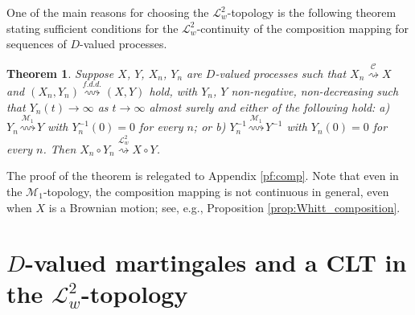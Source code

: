 \documentclass[final]{amsart}
\newtheorem{thm}{Theorem}[section]
\theoremstyle{definition}
\numberwithin{equation}{section}
\newcommand{\cC}{\ensuremath{\mathcal{C}}}
\newcommand{\cL}{\ensuremath{\mathcal{L}}}
\newcommand{\cM}{\ensuremath{\mathcal{M}}}
\begin{document}
One of the main reasons for choosing the $\cL^2_w$-topology is the following theorem stating sufficient conditions
for the $\cL^2_w$-continuity of the composition mapping for sequences of $D$-valued processes.

\begin{thm}\label{thm:comp}
Suppose $X$, $Y$, $X_n$, $Y_n$ are $D$-valued processes such that
$X_n\stackrel{\cC}{\rightsquigarrow} X$ and $(X_n,Y_n) \stackrel{f.d.d.}{\rightsquigarrow} (X,Y)$ hold,
with $Y_n$, $Y$ non-negative, non-decreasing such that $Y_n(t) \to\infty$ as $t\to\infty$ almost surely
and either of the following hold:
a) $Y_n \stackrel{\cM_1}{\rightsquigarrow} Y$ with $Y_n^{-1}(0)=0$ for every $n$; or
b) $Y_n^{-1} \stackrel{\cM_1}{\rightsquigarrow} Y^{-1}$ with $Y_n(0)=0$ for every $n$.
Then $X_n\circ Y_n \stackrel{\cL^2_w}{\rightsquigarrow} X\circ Y$.
\end{thm}

The proof of the theorem is relegated to Appendix \ref{pf:comp}. Note that even in the $\cM_1$-topology, the composition mapping is not continuous in general, even when $X$ is a Brownian motion; see, e.g., Proposition \ref{prop:Whitt_composition}.



\section{$D$-valued martingales and a CLT in the $\cL^2_w$-topology}\label{sec:m1_clt}
\end{document}
